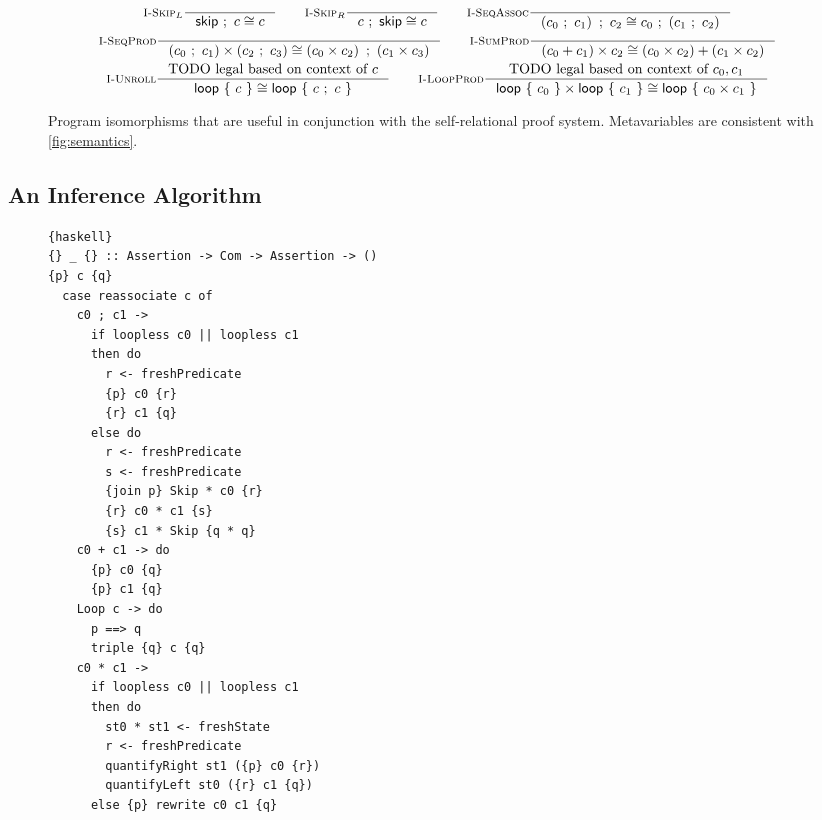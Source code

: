 \documentclass[p.tex]{subfiles}
\begin{document}
\begin{figure}
\begin{spreadlines}{5pt}
\begin{gather*}
  \inference[$\textsc{I-Skip}_L$]{%
  }{%
    \cseq{\cskip}{c} \cong c
  }
  \qquad
  \inference[$\textsc{I-Skip}_R$]{%
  }{%
    \cseq{c}{\cskip} \cong c
  }
  \qquad
  \inference[$\textsc{I-SeqAssoc}$]{%
  }{%
    \cseq{\left(\cseq{c_0}{c_1}\right)}{c_2}
    \cong
    \cseq{c_0}{\left(\cseq{c_1}{c_2}\right)}
  }
  \\
  \inference[\textsc{I-SeqProd}]{%
  }{%
    \cprod{\left(\cseq{c_0}{c_1}\right)}
          {\left(\cseq{c_2}{c_3}\right)} \cong
    \cseq{\left(\cprod{c_0}{c_2}\right)}
         {\left(\cprod{c_1}{c_3}\right)}
  }
  \qquad
  \inference[\textsc{I-SumProd}]{%
  }{%
    \cprod{(\csum{c_0}{c_1})}{c_2} \cong
    \csum{(\cprod{c_0}{c_2})}{(\cprod{c_1}{c_2})}
  }
  \\
  \inference[\textsc{I-Unroll}]{%
    \text{TODO legal based on context of $c$}
  }{%
    \cloop{c} \cong \cloop{\cseq{c}{c}}
  }
  \qquad
  \inference[\textsc{I-LoopProd}]{%
    \text{TODO legal based on context of $c_0, c_1$}
  }{%
    \cprod{\cloop{c_0}}{\cloop{c_1}} \cong \cloop{\cprod{c_0}{c_1}}
  }
\end{gather*}
\end{spreadlines}
\caption{%
  Program isomorphisms that are useful in conjunction with the
  self-relational proof system. Metavariables are consistent with
  \cref{fig:semantics}.
}
\end{figure}

\subsection{An Inference Algorithm}

\begin{figure}
\begin{lstlisting}{haskell}
{} _ {} :: Assertion -> Com -> Assertion -> ()
{p} c {q}
  case reassociate c of
    c0 ; c1 ->
      if loopless c0 || loopless c1
      then do
        r <- freshPredicate
        {p} c0 {r}
        {r} c1 {q}
      else do
        r <- freshPredicate
        s <- freshPredicate
        {join p} Skip * c0 {r}
        {r} c0 * c1 {s}
        {s} c1 * Skip {q * q}
    c0 + c1 -> do
      {p} c0 {q}
      {p} c1 {q}
    Loop c -> do
      p ==> q
      triple {q} c {q}
    c0 * c1 ->
      if loopless c0 || loopless c1
      then do
        st0 * st1 <- freshState
        r <- freshPredicate
        quantifyRight st1 ({p} c0 {r})
        quantifyLeft st0 ({r} c1 {q})
      else {p} rewrite c0 c1 {q}
\end{lstlisting}
\end{figure}
\end{document}
